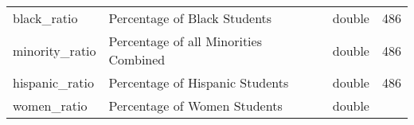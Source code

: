 \documentclass[
]{article}
\begin{document}
\begin{longtable}[]{@{}llll@{}}
\begin{minipage}[t]{0.19\columnwidth}\raggedright
black\_ratio\strut
\end{minipage} & \begin{minipage}[t]{0.28\columnwidth}\raggedright
Percentage of Black Students\strut
\end{minipage} & \begin{minipage}[t]{0.18\columnwidth}\raggedright
double\strut
\end{minipage} & \begin{minipage}[t]{0.23\columnwidth}\raggedright
486\strut
\end{minipage}\tabularnewline
\begin{minipage}[t]{0.19\columnwidth}\raggedright
minority\_ratio\strut
\end{minipage} & \begin{minipage}[t]{0.28\columnwidth}\raggedright
Percentage of all Minorities Combined\strut
\end{minipage} & \begin{minipage}[t]{0.18\columnwidth}\raggedright
double\strut
\end{minipage} & \begin{minipage}[t]{0.23\columnwidth}\raggedright
486\strut
\end{minipage}\tabularnewline
\begin{minipage}[t]{0.19\columnwidth}\raggedright
hispanic\_ratio\strut
\end{minipage} & \begin{minipage}[t]{0.28\columnwidth}\raggedright
Percentage of Hispanic Students\strut
\end{minipage} & \begin{minipage}[t]{0.18\columnwidth}\raggedright
double\strut
\end{minipage} & \begin{minipage}[t]{0.23\columnwidth}\raggedright
486\strut
\end{minipage}\tabularnewline
\begin{minipage}[t]{0.19\columnwidth}\raggedright
women\_ratio\strut
\end{minipage} & \begin{minipage}[t]{0.28\columnwidth}\raggedright
Percentage of Women Students\strut
\end{minipage} & \begin{minipage}[t]{0.18\columnwidth}\raggedright
double\strut
\end{minipage} & \begin{minipage}[t]{0.23\columnwidth}\raggedright

\end{minipage}
\end{longtable}
\end{document}
